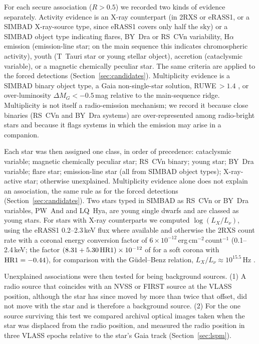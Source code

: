 \documentclass[linenumbers]{aastex702}
\newcommand{\Lnu}{L_\nu}
\begin{document}
For each secure association ($R>0.5$) we recorded two kinds of evidence separately. Activity evidence is an X-ray counterpart (in 2RXS or eRASS1, or a SIMBAD X-ray-source type, since eRASS1 covers only half the sky) or a SIMBAD object type indicating flares, BY~Dra or RS~CVn variability, H$\alpha$ emission (emission-line star; on the main sequence this indicates chromospheric activity), youth (T~Tauri star or young stellar object), accretion (cataclysmic variable), or a magnetic chemically peculiar star. The same criteria are applied to the forced detections (Section~\ref{sec:candidates}). Multiplicity evidence is a SIMBAD binary object type, a Gaia non-single-star solution, RUWE\,$>1.4$ \citep{Lindegren2021}, or over-luminosity $\Delta M_G<-0.5$\,mag relative to the main-sequence ridge. Multiplicity is not itself a radio-emission mechanism; we record it because close binaries (RS~CVn and BY~Dra systems) are over-represented among radio-bright stars and because it flags systems in which the emission may arise in a companion.

Each star was then assigned one class, in order of precedence: cataclysmic variable; magnetic chemically peculiar star; RS~CVn binary; young star; BY~Dra variable; flare star; emission-line star (all from SIMBAD object types); X-ray-active star; otherwise unexplained. Multiplicity evidence alone does not explain an association, the same rule as for the forced detections (Section~\ref{sec:candidates}). Two stars typed in SIMBAD as RS~CVn or BY~Dra variables, PW~And and LQ~Hya, are young single dwarfs \citep{LopezSantiago2003,Lehtinen2012} and are classed as young stars. For stars with X-ray counterparts we computed $\log(L_X/\Lnu)$, using the eRASS1 0.2--2.3\,keV flux where available and otherwise the 2RXS count rate with a coronal energy conversion factor of $6\times10^{-12}$\,erg\,cm$^{-2}$\,count$^{-1}$ (0.1--2.4\,keV; the factor $(8.31+5.30\,{\rm HR1})\times10^{-12}$ of \citealt{Schmitt1995} for a soft corona with ${\rm HR1}=-0.44$), for comparison with the G\"udel--Benz relation, $L_X/\Lnu\approx10^{15.5}$\,Hz \citep{GudelBenz1993}.

Unexplained associations were then tested for being background sources. (1) A radio source that coincides with an NVSS or FIRST source at the VLASS position, although the star has since moved by more than twice that offset, did not move with the star and is therefore a background source. (2) For the one source surviving this test we compared archival optical images taken when the star was displaced from the radio position, and measured the radio position in three VLASS epochs relative to the star's Gaia track (Section~\ref{sec:lspm}).
\end{document}
